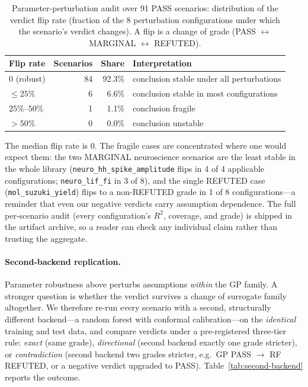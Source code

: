 \documentclass[review,3p]{elsarticle}
\begin{document}
\begin{table}[h]
    \centering
    \caption{Parameter-perturbation audit over 91 PASS scenarios: distribution of
    the verdict flip rate (fraction of the 8 perturbation configurations under
    which the scenario's verdict changes). A flip is a change of grade
    (PASS $\leftrightarrow$ MARGINAL $\leftrightarrow$ REFUTED).}
    \label{tab:sensitivity}
    \begin{tabular}{l r r l}
        \toprule
        Flip rate & Scenarios & Share & Interpretation \\
        \midrule
        0 (robust)        & 84 & 92.3\% & conclusion stable under all perturbations \\
        $\leq 25\%$       & 6  & 6.6\%  & conclusion stable in most configurations \\
        $25\%$--$50\%$    & 1  & 1.1\%  & conclusion fragile \\
        $> 50\%$          & 0  & 0.0\%  & conclusion unstable \\
        \bottomrule
    \end{tabular}
\end{table}

The median flip rate is 0. The fragile cases are concentrated where one would expect them: the two MARGINAL neuroscience scenarios are the least stable in the whole library (\texttt{neuro\_hh\_spike\_amplitude} flips in 4 of 4 applicable configurations; \texttt{neuro\_lif\_fi} in 3 of 8), and the single REFUTED case (\texttt{mol\_suzuki\_yield}) flips to a non-REFUTED grade in 1 of 8 configurations---a reminder that even our negative verdicts carry assumption dependence. The full per-scenario audit (every configuration's $R^2$, coverage, and grade) is shipped in the artifact archive, so a reader can check any individual claim rather than trusting the aggregate.

\paragraph{Second-backend replication.}
Parameter robustness above perturbs assumptions \emph{within} the GP family. A stronger question is whether the verdict survives a change of surrogate family altogether. We therefore re-run every scenario with a second, structurally different backend---a random forest with conformal calibration---on the \emph{identical} training and test data, and compare verdicts under a pre-registered three-tier rule: \emph{exact} (same grade), \emph{directional} (second backend exactly one grade stricter), or \emph{contradiction} (second backend two grades stricter, e.g.\ GP PASS $\to$ RF REFUTED, or a negative verdict upgraded to PASS). Table~\ref{tab:second-backend} reports the outcome.
\end{document}
